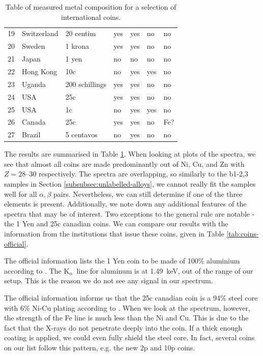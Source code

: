 \documentclass[11pt,a4paper,twoside,onecolumn]{article}
\newcommand{\Kalpha}{$\mathrm{K}_\alpha$~}
\begin{document}
\begin{table}[!htbp]
\begin{tabular}{@{}lllllll@{}}
    19 & Switzerland    & 20 centim      & yes & yes & no  & no    \\
    20 & Sweden         & 1 krona        & yes & yes & no  & no    \\
    21 & Japan          & 1 yen          & no  & no  & no  & no    \\
    22 & Hong Kong      & 10c            & no  & yes & yes & no    \\
    23 & Uganda         & 200 schillings & yes & yes & no  & no    \\
    24 & USA            & 25c            & yes & yes & no  & no    \\
    25 & USA            & 1c             & no  & yes & yes & no    \\
    26 & Canada         & 25c            & yes & yes & no  & Fe?   \\
    27 & Brazil         & 5 centavos     & no  & yes & no  & no    \\ \bottomrule
    \end{tabular}
    \caption{Table of measured metal composition for a selection of international coins.}
    \label{tab:coin-measured}
\end{table}

The results are summarised in Table \ref{tab:coin-measured}. When looking at plots of the spectra, we see that almost all coins are made predominantly out of Ni, Cu, and Zn with $Z=\numrange{28}{30}$ respectively. The spectra are overlapping, so similarly to the b1-2,3 samples in Section \ref{subsubsec:unlabelled-alloys}, we cannot really fit the samples well for all $\alpha, \beta$ pairs. Nevertheless, we can still determine if one of the three elements is present. Additionally, we note down any additional features of the spectra that may be of interest. Two exceptions to the general rule are notable - the 1 Yen and 25c canadian coins. We can compare our results with the information from the institutions that issue these coins, given in Table \ref{tab:coins-official}.

The official information lists the 1 Yen coin to be made of 100\% aluminium according to \cite{JapanYen}. The \Kalpha line for aluminum is at \qty{1.49}{keV}, out of the range of our setup. This is the reason we do not see any signal in our spectrum.

The official information informs us that the 25c canadian coin is a 94\% steel core with 6\% Ni-Cu plating according to \cite{CanadaCoin}. When we look at the spectrum, however, the strength of the Fe line is much less than the Ni and Cu. This is due to the fact that the X-rays do not penetrate deeply into the coin. If a thick enough coating is applied, we could even fully shield the steel core. In fact, several coins on our list follow this pattern, e.g. the new 2p and 10p coins.
\end{document}
